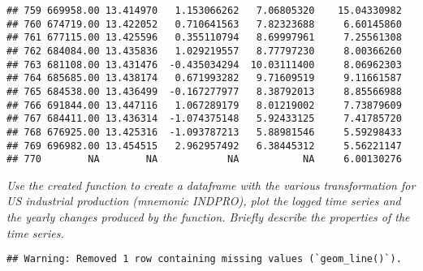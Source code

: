 \documentclass[
]{article}
\newenvironment{Shaded}{\begin{snugshade}}{\end{snugshade}}
\newcommand{\AttributeTok}[1]{\textcolor[rgb]{0.77,0.63,0.00}{#1}}
\newcommand{\DecValTok}[1]{\textcolor[rgb]{0.00,0.00,0.81}{#1}}
\newcommand{\FloatTok}[1]{\textcolor[rgb]{0.00,0.00,0.81}{#1}}
\newcommand{\FunctionTok}[1]{\textcolor[rgb]{0.00,0.00,0.00}{#1}}
\newcommand{\NormalTok}[1]{#1}
\newcommand{\OtherTok}[1]{\textcolor[rgb]{0.56,0.35,0.01}{#1}}
\newcommand{\SpecialCharTok}[1]{\textcolor[rgb]{0.00,0.00,0.00}{#1}}
\newcommand{\StringTok}[1]{\textcolor[rgb]{0.31,0.60,0.02}{#1}}
\begin{document}
\begin{verbatim}
## 759 669958.00 13.414970   1.153066262   7.06805320    15.04330982
## 760 674719.00 13.422052   0.710641563   7.82323688     6.60145860
## 761 677115.00 13.425596   0.355110794   8.69997961     7.25561308
## 762 684084.00 13.435836   1.029219557   8.77797230     8.00366260
## 763 681108.00 13.431476  -0.435034294  10.03111400     8.06962303
## 764 685685.00 13.438174   0.671993282   9.71609519     9.11661587
## 765 684538.00 13.436499  -0.167277977   8.38792013     8.85566988
## 766 691844.00 13.447116   1.067289179   8.01219002     7.73879609
## 767 684411.00 13.436314  -1.074375148   5.92433125     7.41785720
## 768 676925.00 13.425316  -1.093787213   5.88981546     5.59298433
## 769 696982.00 13.454515   2.962957492   6.38445312     5.56221147
## 770        NA        NA            NA           NA     6.00130276
\end{verbatim}

\textit{Use the created function to create a dataframe with the various transformation for US industrial production (mnemonic INDPRO), plot the logged time series and the yearly changes produced by the function. Briefly describe the properties of the time series.}

\begin{Shaded}
\end{Shaded}

\begin{verbatim}
## Warning: Removed 1 row containing missing values (`geom_line()`).
\end{verbatim}
\end{document}
